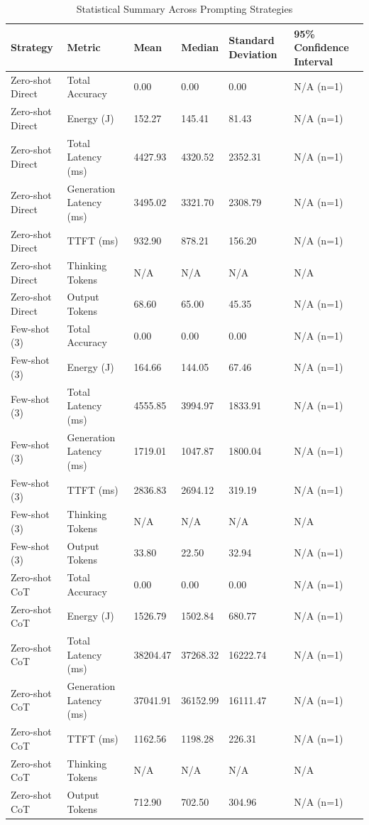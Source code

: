 \begin{table}
\caption{Statistical Summary Across Prompting Strategies}
\label{tab:statistical_summary}
\begin{tabular}{llllll}
\toprule
Strategy & Metric & Mean & Median & Standard Deviation & 95\% Confidence Interval \\
\midrule
Zero-shot Direct & Total Accuracy & 0.00 & 0.00 & 0.00 & N/A (n=1) \\
Zero-shot Direct & Energy (J) & 152.27 & 145.41 & 81.43 & N/A (n=1) \\
Zero-shot Direct & Total Latency (ms) & 4427.93 & 4320.52 & 2352.31 & N/A (n=1) \\
Zero-shot Direct & Generation Latency (ms) & 3495.02 & 3321.70 & 2308.79 & N/A (n=1) \\
Zero-shot Direct & TTFT (ms) & 932.90 & 878.21 & 156.20 & N/A (n=1) \\
Zero-shot Direct & Thinking Tokens & N/A & N/A & N/A & N/A \\
Zero-shot Direct & Output Tokens & 68.60 & 65.00 & 45.35 & N/A (n=1) \\
Few-shot (3) & Total Accuracy & 0.00 & 0.00 & 0.00 & N/A (n=1) \\
Few-shot (3) & Energy (J) & 164.66 & 144.05 & 67.46 & N/A (n=1) \\
Few-shot (3) & Total Latency (ms) & 4555.85 & 3994.97 & 1833.91 & N/A (n=1) \\
Few-shot (3) & Generation Latency (ms) & 1719.01 & 1047.87 & 1800.04 & N/A (n=1) \\
Few-shot (3) & TTFT (ms) & 2836.83 & 2694.12 & 319.19 & N/A (n=1) \\
Few-shot (3) & Thinking Tokens & N/A & N/A & N/A & N/A \\
Few-shot (3) & Output Tokens & 33.80 & 22.50 & 32.94 & N/A (n=1) \\
Zero-shot CoT & Total Accuracy & 0.00 & 0.00 & 0.00 & N/A (n=1) \\
Zero-shot CoT & Energy (J) & 1526.79 & 1502.84 & 680.77 & N/A (n=1) \\
Zero-shot CoT & Total Latency (ms) & 38204.47 & 37268.32 & 16222.74 & N/A (n=1) \\
Zero-shot CoT & Generation Latency (ms) & 37041.91 & 36152.99 & 16111.47 & N/A (n=1) \\
Zero-shot CoT & TTFT (ms) & 1162.56 & 1198.28 & 226.31 & N/A (n=1) \\
Zero-shot CoT & Thinking Tokens & N/A & N/A & N/A & N/A \\
Zero-shot CoT & Output Tokens & 712.90 & 702.50 & 304.96 & N/A (n=1) \\

\end{tabular}
\end{table}

